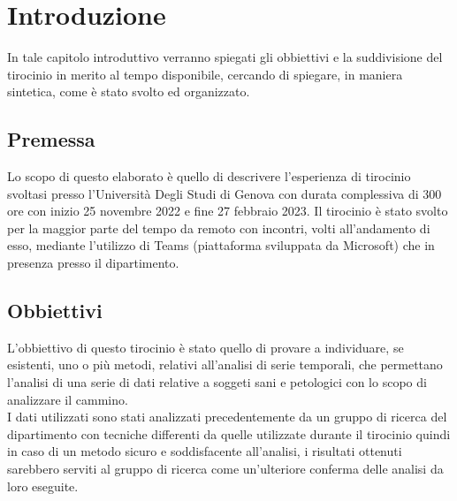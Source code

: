 \section{Introduzione}
In tale capitolo introduttivo verranno spiegati gli obbiettivi e la suddivisione del tirocinio
in merito al tempo disponibile, cercando di spiegare, in maniera sintetica, come è stato
svolto ed organizzato.

\subsection{Premessa}
Lo scopo di questo elaborato è quello di descrivere l'esperienza di tirocinio svoltasi presso
l'Università Degli Studi di Genova con durata complessiva di 300 ore con inizio 25 novembre 2022
e fine 27 febbraio 2023. Il tirocinio è stato svolto per la maggior parte del tempo da remoto
con incontri, volti all'andamento di esso, mediante l'utilizzo di Teams (piattaforma sviluppata da Microsoft)
che in presenza presso il dipartimento. 

\subsection{Obbiettivi}
L'obbiettivo di questo tirocinio è stato quello di provare a individuare, se esistenti, uno o più metodi, 
relativi all'analisi di serie temporali, che permettano l'analisi di una serie di 
dati relative a soggeti sani e petologici con lo scopo di analizzare il cammino.
\\
I dati utilizzati sono stati analizzati precedentemente da un gruppo di ricerca del dipartimento
con tecniche differenti da quelle utilizzate durante il tirocinio
quindi in caso di un metodo sicuro e soddisfacente all'analisi, i risultati ottenuti sarebbero
serviti al gruppo di ricerca come un'ulteriore conferma delle analisi da loro eseguite.


